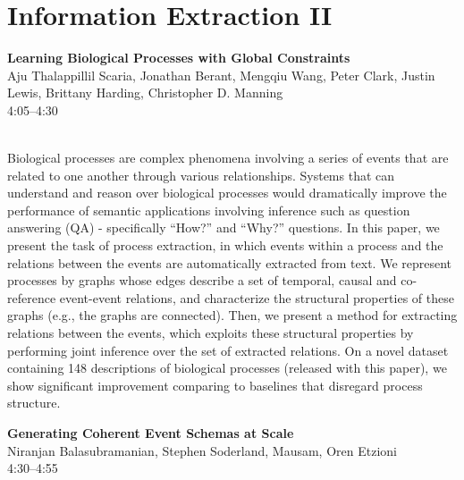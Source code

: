 \documentclass[twoside,makeidx]{book}
\begin{document}
\section{Information Extraction II}
\vspace{-1em}
\par\vspace{2em}\noindent%
\begin{minipage}{\linewidth}%
\begin{center}
\textbf{\normalsize Learning Biological Processes with Global Constraints}\\
\normalsize  Aju Thalappillil Scaria,  Jonathan Berant,  Mengqiu Wang,  Peter Clark,  Justin Lewis,  Brittany Harding,  Christopher D. Manning\\
{\small 4:05--4:30}\\
\end{center}
\end{minipage}\\[0.5em]
\nopagebreak%
\noindent%
{\small Biological processes are complex phenomena involving a series of events that are related to one another through various relationships. Systems that can understand and reason over biological processes would dramatically improve the performance of semantic applications involving inference such as question answering (QA) - specifically ``How?'' and ``Why?'' questions. In this paper, we present the task of process extraction, in which events within a process and the relations between the events are automatically extracted from text. We represent processes by graphs whose edges describe a set of temporal, causal and co-reference event-event relations, and characterize the structural properties of these graphs (e.g., the graphs are connected). Then, we present a method for extracting relations between the events, which exploits these structural properties by performing joint inference over the set of extracted relations. On a novel dataset containing 148 descriptions of biological processes (released with this paper), we show significant improvement comparing to baselines that disregard process structure.}
\par\vspace{2em}\noindent%
\begin{minipage}{\linewidth}%
\begin{center}
\textbf{\normalsize Generating Coherent Event Schemas at Scale}\\
\normalsize  Niranjan Balasubramanian,  Stephen Soderland,  Mausam,  Oren Etzioni\\
{\small 4:30--4:55}\\
\end{center}
\end{minipage}\\[0.5em]
\end{document}
